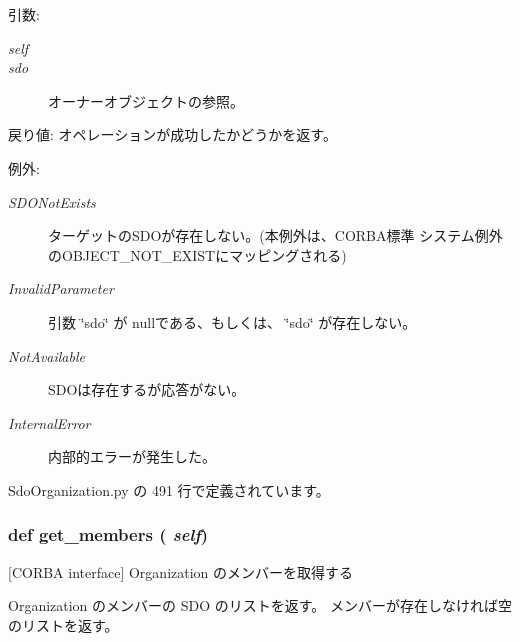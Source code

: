 \begin{Desc}
\item[引数:]
\begin{description}
\item[{\em self}]\item[{\em sdo}]オーナーオブジェクトの参照。\end{description}
\end{Desc}
\begin{Desc}
\item[戻り値:]オペレーションが成功したかどうかを返す。\end{Desc}
\begin{Desc}
\item[例外:]
\begin{description}
\item[{\em SDONotExists}]ターゲットのSDOが存在しない。(本例外は、CORBA標準 システム例外のOBJECT\_\-NOT\_\-EXISTにマッピングされる) \item[{\em InvalidParameter}]引数 \char`\"{}sdo\char`\"{} が nullである、もしくは、 \char`\"{}sdo\char`\"{} が存在しない。 \item[{\em NotAvailable}]SDOは存在するが応答がない。 \item[{\em InternalError}]内部的エラーが発生した。 \end{description}
\end{Desc}


 SdoOrganization.py の 491 行で定義されています。
\subsubsection{\setlength{\rightskip}{0pt plus 5cm}def get\_\-members ( {\em self})}\label{classsource__py_1_1_sdo_organization_1_1_organization__impl_8c2cf26272a10f802c1a464ea4958cc1}


[CORBA interface] Organization のメンバーを取得する 

Organization のメンバーの SDO のリストを返す。 メンバーが存在しなければ空のリストを返す。

